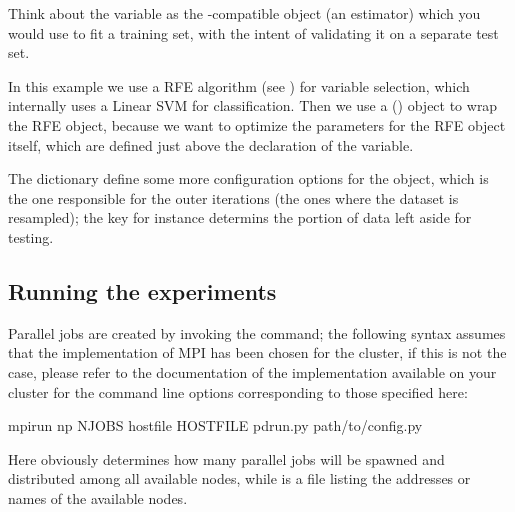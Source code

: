 \documentclass[letterpaper,10pt,english]{sphinxmanual}
\begin{document}
Think about the  variable as the -compatible object (an estimator) which you would use to fit a training set, with the intent of validating it on a separate test set.

In this example we use a RFE algorithm (see ) for variable selection, which internally uses a Linear SVM for classification.
Then we use a  () object to wrap the RFE object, because we want to optimize the parameters for the RFE object itself, which are defined just above the declaration of the  variable.

The dictionary  define some more configuration options for the {\hyperref[\detokenize{api:palladio.model_assessment.ModelAssessment}]{}} object, which is the one responsible for the outer iterations (the ones where the dataset is resampled);
the  key for instance determins the portion of data left aside for testing.


\subsection{Running the experiments}
\label{\detokenize{tutorial:running-experiments}}\label{\detokenize{tutorial:running-the-experiments}}
Parallel jobs are created by invoking the  command; the following syntax assumes that the  implementation of MPI has been chosen for the cluster, if this is not the case, please refer to the documentation of the implementation available on your cluster for the command line options corresponding to those specified here:

\begin{sphinxVerbatim}[commandchars=\\\{\}]
\PYGZdl{} mpirun \PYGZhy{}np N\PYGZus{}JOBS \PYGZhy{}\PYGZhy{}hostfile HOSTFILE pd\PYGZus{}run.py path/to/config.py
\end{sphinxVerbatim}

Here  obviously determines how many parallel jobs will be spawned and distributed among all available nodes, while  is a file listing the addresses or names of the available nodes.
\end{document}
